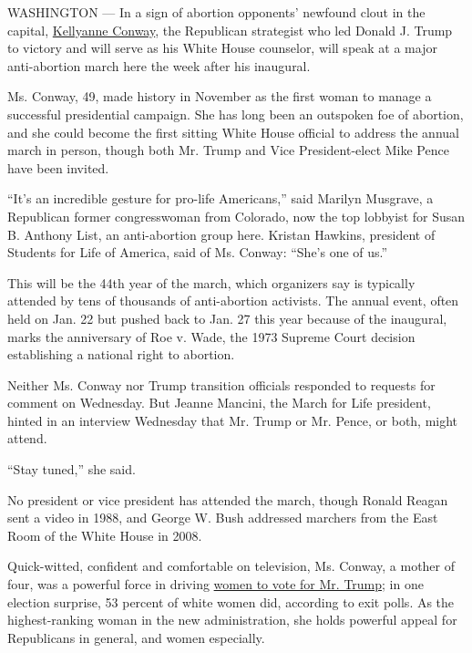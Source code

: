 WASHINGTON --- In a sign of abortion opponents' newfound clout in the
capital,
\href{https://www.nytimes3xbfgragh.onion/2016/11/28/us/politics/kellyanne-conway-donald-trump.html}{Kellyanne
Conway}, the Republican strategist who led Donald J. Trump to victory
and will serve as his White House counselor, will speak at a major
anti-abortion march here the week after his inaugural.

Ms. Conway, 49, made history in November as the first woman to manage a
successful presidential campaign. She has long been an outspoken foe of
abortion, and she could become the first sitting White House official to
address the annual march in person, though both Mr. Trump and Vice
President-elect Mike Pence have been invited.

``It's an incredible gesture for pro-life Americans,'' said Marilyn
Musgrave, a Republican former congresswoman from Colorado, now the top
lobbyist for Susan B. Anthony List, an anti-abortion group here. Kristan
Hawkins, president of Students for Life of America, said of Ms. Conway:
``She's one of us.''

This will be the 44th year of the march, which organizers say is
typically attended by tens of thousands of anti-abortion activists. The
annual event, often held on Jan. 22 but pushed back to Jan. 27 this year
because of the inaugural, marks the anniversary of Roe v. Wade, the 1973
Supreme Court decision establishing a national right to abortion.

Neither Ms. Conway nor Trump transition officials responded to requests
for comment on Wednesday. But Jeanne Mancini, the March for Life
president, hinted in an interview Wednesday that Mr. Trump or Mr. Pence,
or both, might attend.

``Stay tuned,'' she said.

No president or vice president has attended the march, though Ronald
Reagan sent a video in 1988, and George W. Bush addressed marchers from
the East Room of the White House in 2008.

Quick-witted, confident and comfortable on television, Ms. Conway, a
mother of four, was a powerful force in driving
\href{https://www.nytimes3xbfgragh.onion/2016/11/11/us/politics/the-women-who-helped-donald-trump-to-victory.html}{women
to vote for Mr. Trump}; in one election surprise, 53 percent of white
women did, according to exit polls. As the highest-ranking woman in the
new administration, she holds powerful appeal for Republicans in
general, and women especially.

